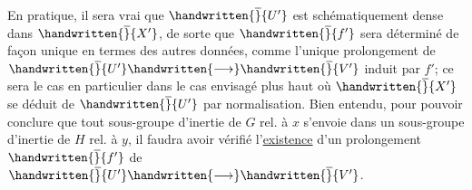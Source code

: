 
En pratique, il sera vrai que $\handwritten{\overline}{U'}$ est schématiquement dense dans $\handwritten{\overline}{X'}$, de sorte que $\handwritten{\overline}{f'}$ sera déterminé de façon unique en termes des autres données, comme l'unique prolongement de $\handwritten{\overline}{U'}\handwritten{\longrightarrow}\handwritten{\overline}{V'}$ induit par $f'$; ce sera le cas en particulier dans le cas envisagé plus haut où $\handwritten{\overline}{X'}$ se déduit de  $\handwritten{\overline}{U'}$ par normalisation. Bien entendu, pour pouvoir conclure que tout sous-groupe d'inertie de $G$ rel. à $x$ s'envoie dans un sous-groupe d'inertie de $H$ rel. à $y$, il faudra avoir vérifié l'\uline{existence} d'un prolongement $\handwritten{\overline}{f'}$ de $\handwritten{\overline}{U'}\handwritten{\longrightarrow}\handwritten{\overline}{V'}$. 

